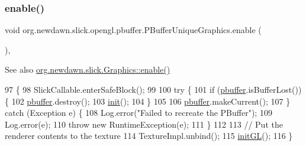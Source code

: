 \subsubsection{\texorpdfstring{enable()}{enable()}}
{\footnotesize\ttfamily void org.\+newdawn.\+slick.\+opengl.\+pbuffer.\+P\+Buffer\+Unique\+Graphics.\+enable (\begin{DoxyParamCaption}{ }\end{DoxyParamCaption})\hspace{0.3cm}{\ttfamily [inline]}, {\ttfamily [protected]}}

\begin{DoxySeeAlso}{See also}
\mbox{\hyperlink{classorg_1_1newdawn_1_1slick_1_1_graphics_a094766a3a763c402d5d077710b4d3fc5}{org.\+newdawn.\+slick.\+Graphics\+::enable()}} 
\end{DoxySeeAlso}

\begin{DoxyCode}
97                             \{
98         SlickCallable.enterSafeBlock();
99         
100         \textcolor{keywordflow}{try} \{
101             \textcolor{keywordflow}{if} (\mbox{\hyperlink{classorg_1_1newdawn_1_1slick_1_1opengl_1_1pbuffer_1_1_p_buffer_unique_graphics_a22fa7421a781dae3d7c504fc0eb10315}{pbuffer}}.isBufferLost()) \{
102                 \mbox{\hyperlink{classorg_1_1newdawn_1_1slick_1_1opengl_1_1pbuffer_1_1_p_buffer_unique_graphics_a22fa7421a781dae3d7c504fc0eb10315}{pbuffer}}.destroy();
103                 \mbox{\hyperlink{classorg_1_1newdawn_1_1slick_1_1opengl_1_1pbuffer_1_1_p_buffer_unique_graphics_ad2c4549df1e2d1bb805ab1968000cbe6}{init}}();
104             \}
105 
106             \mbox{\hyperlink{classorg_1_1newdawn_1_1slick_1_1opengl_1_1pbuffer_1_1_p_buffer_unique_graphics_a22fa7421a781dae3d7c504fc0eb10315}{pbuffer}}.makeCurrent();
107         \} \textcolor{keywordflow}{catch} (Exception e) \{
108             Log.error(\textcolor{stringliteral}{"Failed to recreate the PBuffer"});
109             Log.error(e);
110             \textcolor{keywordflow}{throw} \textcolor{keyword}{new} RuntimeException(e);
111         \}
112         
113         \textcolor{comment}{// Put the renderer contents to the texture}
114         TextureImpl.unbind();
115         \mbox{\hyperlink{classorg_1_1newdawn_1_1slick_1_1opengl_1_1pbuffer_1_1_p_buffer_unique_graphics_ac96d393e734949dafa1894e2b5e329e8}{initGL}}();
116     \}
\end{DoxyCode}
\mbox{\label{classorg_1_1newdawn_1_1slick_1_1opengl_1_1pbuffer_1_1_p_buffer_unique_graphics_a3331dd0ca3d82959b02bdfe4be9a274b}} 
